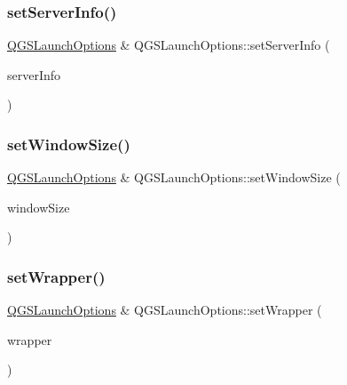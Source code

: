 \mbox{\label{class_q_g_s_launch_options_af7af4328eaf708252b5aaca674fcd7f8}} 
\subsubsection{\texorpdfstring{set\+Server\+Info()}{setServerInfo()}}
{\footnotesize\ttfamily \mbox{\hyperlink{class_q_g_s_launch_options}{Q\+G\+S\+Launch\+Options}} \& Q\+G\+S\+Launch\+Options\+::set\+Server\+Info (\begin{DoxyParamCaption}\item[{const \mbox{\hyperlink{class_q_g_s_server_info}{Q\+G\+S\+Server\+Info}} \&}]{server\+Info }\end{DoxyParamCaption})}

\mbox{\label{class_q_g_s_launch_options_a9210cdad666d5d65190ea56746eb770b}} 
\subsubsection{\texorpdfstring{set\+Window\+Size()}{setWindowSize()}}
{\footnotesize\ttfamily \mbox{\hyperlink{class_q_g_s_launch_options}{Q\+G\+S\+Launch\+Options}} \& Q\+G\+S\+Launch\+Options\+::set\+Window\+Size (\begin{DoxyParamCaption}\item[{const Q\+Size \&}]{window\+Size }\end{DoxyParamCaption})}

\mbox{\label{class_q_g_s_launch_options_a9f726b4c4f8853b42f978f33fe9867b2}} 
\subsubsection{\texorpdfstring{set\+Wrapper()}{setWrapper()}}
{\footnotesize\ttfamily \mbox{\hyperlink{class_q_g_s_launch_options}{Q\+G\+S\+Launch\+Options}} \& Q\+G\+S\+Launch\+Options\+::set\+Wrapper (\begin{DoxyParamCaption}\item[{const Q\+String \&}]{wrapper }\end{DoxyParamCaption})}




